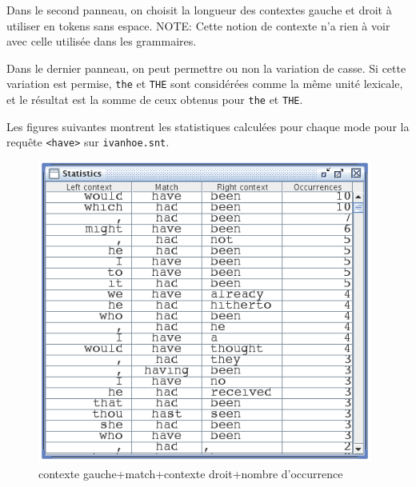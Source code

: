 \bigskip
\noindent Dans le second panneau, on choisit la longueur des contextes gauche et droit à utiliser en
tokens sans espace.
NOTE: Cette notion de contexte n'a rien à voir avec celle utilisée dans les grammaires.


\bigskip
\noindent Dans le dernier panneau, on peut permettre ou non la variation de casse.
Si cette variation est permise, \verb$the$ et \verb$THE$ sont considérées comme la même unité
lexicale, et le résultat est la somme de ceux obtenus pour \verb$the$ et \verb$THE$.

\bigskip
\noindent Les figures suivantes montrent les statistiques calculées pour chaque mode pour la requête
\verb$<have>$ sur \verb$ivanhoe.snt$.


\bigskip
\begin{figure}[!h]
\begin{center}
\includegraphics[width=11cm]{resources/img/fig4-10.png}
\caption{contexte gauche+match+contexte droit+nombre d'occurrence\label{fig-statistics-mode0}}
\end{center}
\end{figure}

